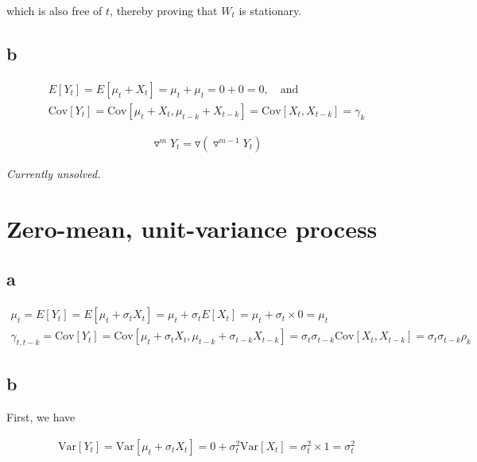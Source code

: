 \documentclass[]{book}
\theoremstyle{definition}
\theoremstyle{definition}
\theoremstyle{remark}
\begin{document}
which is also free of \(t\), thereby proving that \(W_t\) is stationary.

\subsection*{b}\label{b-6}

\begin{gather*}
  E[Y_t] = E[\mu_t + X_t] = \mu_t + \mu_t = 0 + 0 = 0, \quad \text{and}\\
  \text{Cov}[Y_t] = \text{Cov}[\mu_t + X_t, \mu_{t-k} + X_{t-k}] = \text{Cov}[X_t, X_{t-k}] = \gamma_k
\end{gather*}

\begin{gather*}
  \triangledown^m Y_t = \triangledown(\triangledown^{m−1}Y_t)
\end{gather*}

\emph{Currently unsolved.}

\section{Zero-mean, unit-variance
process}\label{zero-mean-unit-variance-process}

\subsection*{a}\label{a-7}

\begin{gather*}
  \mu_t = E[Y_t] = E[\mu_t + \sigma_t X_t] = \mu_t + \sigma_t E[X_t] = \mu_t + \sigma_t \times 0 = \mu_t\\
  \gamma_{t,t-k} = \text{Cov}[Y_t] = \text{Cov}[\mu_t + \sigma_t X_t, \mu_{t-k} + \sigma_{t-k} X_{t-k}] = 
    \sigma_t \sigma_{t-k} \text{Cov}[X_t, X_{t-k}] = \sigma_t \sigma_{t-k} \rho_k
\end{gather*}

\subsection*{b}\label{b-7}

First, we have

\begin{gather*}
  \text{Var}[Y_t] = \text{Var}[\mu_t + \sigma_t X_t] = 0 + \sigma_t^2 \text{Var}[X_t] = \sigma_t^2 \times 1 = \sigma_t^2
\end{gather*}
\end{document}
